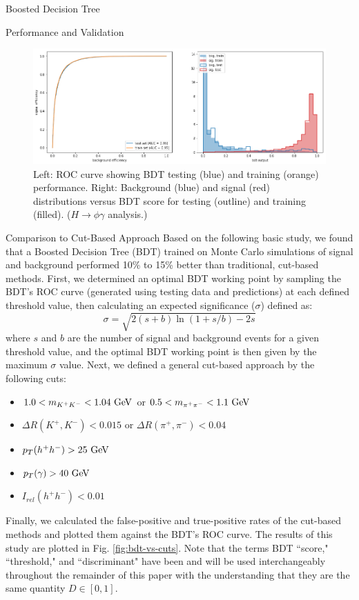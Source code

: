 \begin{section}{Boosted Decision Tree}
\begin{subsection}{Performance and Validation}
\begin{figure}[htb]
\begin{center}
\includegraphics[width=.95\linewidth]{Dissertation/fig/bdt-performance.png}
\end{center}
\caption{Left: ROC curve showing BDT testing (blue) and training (orange) performance. Right: Background (blue) and signal (red) distributions versus BDT score for testing (outline) and training (filled). ($H\rightarrow\phi\gamma$ analysis.)}
\label{fig:bdt-performance}
\end{figure}

\end{subsection}
\begin{subsection}{Comparison to Cut-Based Approach}\label{comp-to-cuts}
Based on the following basic study, we found that a Boosted Decision Tree (BDT) trained on Monte Carlo simulations of signal and background performed 10\% to 15\% better than traditional, cut-based methods. First, we determined an optimal BDT working point by sampling the BDT's ROC curve (generated using testing data and predictions) at each defined threshold value, then calculating an expected significance ($\sigma$) defined as:
\begin{equation}\label{expsig-eq}
    \sigma = \sqrt{2(s+b)\ln(1+s/b)-2s}
\end{equation}
\noindent where $s$ and $b$ are the number of signal and background events for a given threshold value, and the optimal BDT working point is then given by the maximum $\sigma$ value. Next, we defined a general cut-based approach by the following cuts:
\begin{itemize}
    \item $1.0 < m_{K^{+}K^{-}} < 1.04\textnormal{ GeV}$ or $0.5 < m_{\pi^{+}\pi^{-}} < 1.1\textnormal{ GeV}$
    \item $\Delta R(K^{+}, K^{-}) < 0.015$ or $\Delta R(\pi^{+}, \pi^{-}) < 0.04$
    \item $p_{T}(h^{+}h^{-}) > 25\textnormal{ GeV}$
    \item $p_{T}(\gamma) > 40\textnormal{ GeV}$
    \item $I_{rel}(h^{+}h^{-}) < 0.01$
\end{itemize}
\noindent Finally, we calculated the false-positive and true-positive rates of the cut-based methods and plotted them against the BDT's ROC curve. The results of this study are plotted in Fig. \ref{fig:bdt-vs-cuts}. Note that the terms BDT ``score," ``threshold," and ``discriminant" have been and will be used interchangeably throughout the remainder of this paper with the understanding that they are the same quantity $D \in [0,1]$.


\end{subsection}
\end{section}
